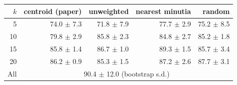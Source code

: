 \begin{tabular}{r rrrr}
\toprule
$k$ & centroid (paper) & unweighted & nearest minutia & random \\
\midrule
5 & 74.0 $\pm$ 7.3 & 71.8 $\pm$ 7.9 & 77.7 $\pm$ 2.9 & 75.2 $\pm$ 8.5 \\
10 & 79.8 $\pm$ 2.9 & 85.8 $\pm$ 2.3 & 84.8 $\pm$ 2.7 & 85.2 $\pm$ 1.8 \\
15 & 85.8 $\pm$ 1.4 & 86.7 $\pm$ 1.0 & 89.3 $\pm$ 1.5 & 85.7 $\pm$ 3.4 \\
20 & 86.2 $\pm$ 0.9 & 85.3 $\pm$ 1.5 & 87.2 $\pm$ 2.6 & 87.7 $\pm$ 3.1 \\
\midrule
All & \multicolumn{4}{c}{90.4 $\pm$ 12.0 (bootstrap s.d.)} \\
\bottomrule
\end{tabular}
